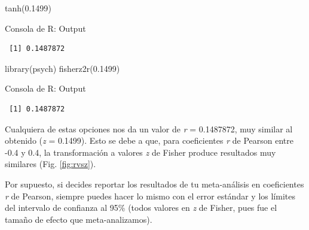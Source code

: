 \documentclass[
  bookmarksnumbered]{article}
\newenvironment{Shaded}{\begin{snugshade}}{\end{snugshade}}
\newcommand{\FloatTok}[1]{\textcolor[rgb]{0.69,0.50,0.00}{#1}}
\newcommand{\FunctionTok}[1]{\textcolor[rgb]{0.39,0.29,0.61}{#1}}
\newcommand{\NormalTok}[1]{\textcolor[rgb]{0.12,0.11,0.11}{#1}}
\begin{document}
\begin{Shaded}
\begin{Highlighting}[]
\FunctionTok{tanh}\NormalTok{(}\FloatTok{0.1499}\NormalTok{)}
\end{Highlighting}
\end{Shaded}

\begin{ROut}{Consola de R: Output~\thetcbcounter}
                \begin{footnotesize}
                \begin{verbatim} [1] 0.1487872
 \end{verbatim}
                \end{footnotesize}
                \end{ROut}

\begin{Shaded}
\begin{Highlighting}[]
\FunctionTok{library}\NormalTok{(psych)}
\FunctionTok{fisherz2r}\NormalTok{(}\FloatTok{0.1499}\NormalTok{)}
\end{Highlighting}
\end{Shaded}

\begin{ROut}{Consola de R: Output~\thetcbcounter}
                \begin{footnotesize}
                \begin{verbatim} [1] 0.1487872
 \end{verbatim}
                \end{footnotesize}
                \end{ROut}

Cualquiera de estas opciones nos da un valor de \emph{r} = 0.1487872, muy similar al obtenido (\emph{z} = 0.1499). Esto se debe a que, para coeficientes \emph{r} de Pearson entre -0.4 y 0.4, la transformación a valores \emph{z} de Fisher produce resultados muy similares (Fig. \ref{fig:rvsz}).

Por supuesto, si decides reportar los resultados de tu meta-análisis en coeficientes \emph{r} de Pearson, siempre puedes hacer lo mismo con el error estándar y los límites del intervalo de confianza al 95\% (todos valores en \emph{z} de Fisher, pues fue el tamaño de efecto que meta-analizamos).
\end{document}
